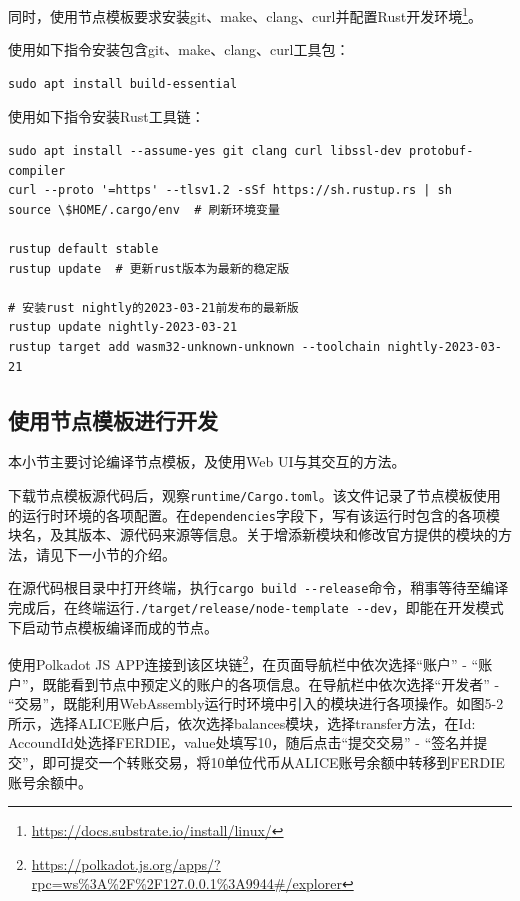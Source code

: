 同时，使用节点模板要求安装git、make、clang、curl并配置Rust开发环境\footnote{\url{https://docs.substrate.io/install/linux/}}。

使用如下指令安装包含git、make、clang、curl工具包：

\begin{lstlisting}[caption={安装工具包}, label={lst:安装工具包}]
sudo apt install build-essential
\end{lstlisting}

使用如下指令安装Rust工具链：

\begin{lstlisting}[caption={安装Rust工具链}, label={lst:安装Rust工具链}]
sudo apt install --assume-yes git clang curl libssl-dev protobuf-compiler
curl --proto '=https' --tlsv1.2 -sSf https://sh.rustup.rs | sh
source \$HOME/.cargo/env  # 刷新环境变量

rustup default stable
rustup update  # 更新rust版本为最新的稳定版

# 安装rust nightly的2023-03-21前发布的最新版
rustup update nightly-2023-03-21
rustup target add wasm32-unknown-unknown --toolchain nightly-2023-03-21
\end{lstlisting}

\subsection{使用节点模板进行开发}

本小节主要讨论编译节点模板，及使用Web UI与其交互的方法。

下载节点模板源代码后，观察\verb|runtime/Cargo.toml|。该文件记录了节点模板使用的运行时环境的各项配置。在\verb|dependencies|字段下，写有该运行时包含的各项模块名，及其版本、源代码来源等信息。关于增添新模块和修改官方提供的模块的方法，请见下一小节的介绍。

在源代码根目录中打开终端，执行\verb|cargo build --release|命令，稍事等待至编译完成后，在终端运行\verb|./target/release/node-template --dev|，即能在开发模式下启动节点模板编译而成的节点。

使用Polkadot JS APP连接到该区块链\footnote{\url{https://polkadot.js.org/apps/?rpc=ws\%3A\%2F\%2F127.0.0.1\%3A9944\#/explorer}}，在页面导航栏中依次选择“账户” - “账户”，既能看到节点中预定义的账户的各项信息。在导航栏中依次选择“开发者” - “交易”，既能利用WebAssembly运行时环境中引入的模块进行各项操作。如图5-2所示，选择ALICE账户后，依次选择balances模块，选择transfer方法，在Id: AccoundId处选择FERDIE，value处填写10，随后点击“提交交易” - “签名并提交”，即可提交一个转账交易，将10单位代币从ALICE账号余额中转移到FERDIE账号余额中。

